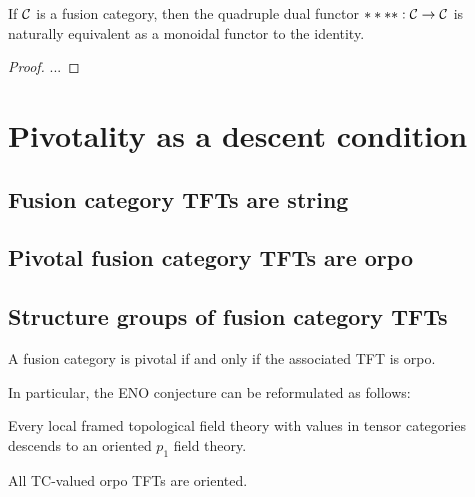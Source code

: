 \documentclass{amsart}
\begin{document}
\begin{theorem} \label{thm-quaddual}
If $\mathcal C$ is a fusion category, then the quadruple dual functor $****: \mathcal C \rightarrow \mathcal C$ is naturally equivalent as a monoidal functor to the identity.
\end{theorem}

\begin{proof}
...
\end{proof}




\section{Pivotality as a descent condition} \label{sec-pivot}

\subsection{Fusion category TFTs are string} \label{sec-pivot-string}

\subsection{Pivotal fusion category TFTs are orpo} \label{sec-pivot-orpo}

\subsection{Structure groups of fusion category TFTs} \label{sec-pivot-struc}

\begin{theorem}
A fusion category is pivotal if and only if the associated TFT is orpo.
\end{theorem}

In particular, the ENO conjecture can be reformulated as follows:
\begin{conjecture}
Every local framed topological field theory with values in tensor categories descends to an oriented $p_1$ field theory.
\end{conjecture}

\begin{conjecture}
All TC-valued orpo TFTs are oriented.
\end{conjecture}
\end{document}
